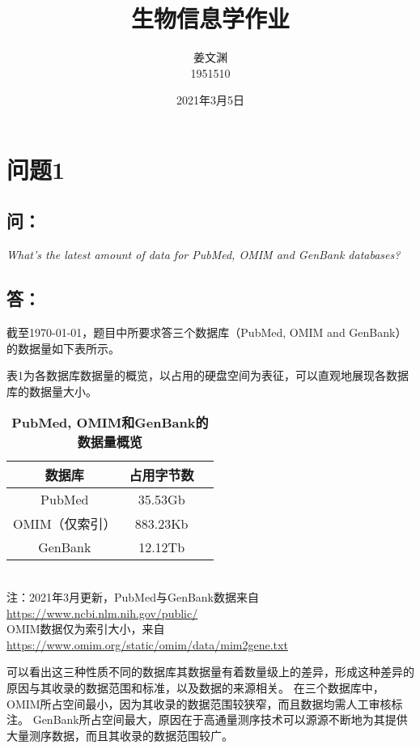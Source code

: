 \documentclass[cn,black,12pt,normal]{elegantnote}
\title{生物信息学作业}
\author{姜文渊\\1951510}
\institute{School of Life Science, Tongji University}
\date{2021年3月5日}
\newcommand{\upcite}[1]{\textsuperscript{\textsuperscript{\cite{#1}}}}
\begin{document}
\maketitle


\section{问题1}
\subsection*{问：}

\textit{What's the latest amount of data for PubMed, OMIM and GenBank databases?}

\subsection*{答：}

截至\today，题目中所要求答三个数据库（PubMed\upcite{canese2013pubmed}, OMIM\upcite{hamosh2005online} and GenBank\upcite{benson2012genbank}）的数据量如下表所示。

表1为各数据库数据量的概览，以占用的硬盘空间为表征，可以直观地展现各数据库的数据量大小。
\begin{table}[H]
    \caption{\textbf{PubMed, OMIM和GenBank的数据量概览}}
    \centering
    \begin{tabular}{ccc}
        \toprule
        数据库&占用字节数\\
        \midrule
        PubMed&35.53Gb\\
        OMIM（仅索引）&883.23Kb\\
        GenBank&12.12Tb\\
        \bottomrule
    \end{tabular}
    \\\tiny{注：2021年3月更新，PubMed与GenBank数据来自\url{https://www.ncbi.nlm.nih.gov/public/}\\OMIM数据仅为索引大小，来自\url{https://www.omim.org/static/omim/data/mim2gene.txt}}
\end{table}
可以看出这三种性质不同的数据库其数据量有着数量级上的差异，形成这种差异的原因与其收录的数据范围和标准，以及数据的来源相关。
在三个数据库中，OMIM所占空间最小，因为其收录的数据范围较狭窄，而且数据均需人工审核标注。
GenBank所占空间最大，原因在于高通量测序技术可以源源不断地为其提供大量测序数据，而且其收录的数据范围较广。
\end{document}
